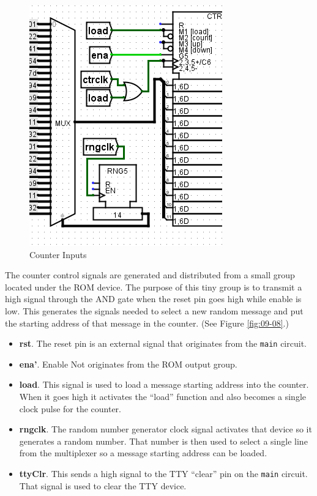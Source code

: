 \begin{figure}[H]
	\centering
	\includegraphics[width=\maxwidth{.95\linewidth}]{gfx/09-07}
	\caption{Counter Inputs}
	\label{fig:09-07}
\end{figure}

The counter control signals are generated and distributed from a small group located under the ROM device. The purpose of this tiny group is to transmit a high signal through the AND gate when the reset pin goes high while enable is low. This generates the signals needed to select a new random message and put the starting address of that message in the counter. (See Figure \ref{fig:09-08}.)
 
\begin{itemize}
	\item \textbf{rst}. The reset pin is an external signal that originates from the \lstinline[columns=fixed]|main| circuit.
	\item \textbf{ena'}. Enable Not originates from the ROM output group.
	\item \textbf{load}. This signal is used to load a message starting address into the counter. When it goes high it activates the ``load'' function and also becomes a single clock pulse for the counter.
	\item \textbf{rngclk}. The random number generator clock signal activates that device so it generates a random number. That number is then used to select a single line from the multiplexer so a message starting address can be loaded.
	\item \textbf{ttyClr}. This sends a high signal to the TTY ``clear'' pin on the \lstinline[columns=fixed]|main| circuit. That signal is used to clear the TTY device.
\end{itemize}

